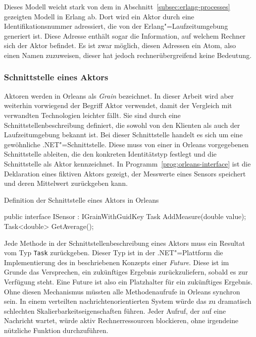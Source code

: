 Dieses Modell weicht stark von dem in Abschnitt~\ref{subsec:erlang-processes} gezeigten Modell in Erlang ab. Dort wird ein Aktor durch eine Identifikationsnummer adressiert, die von der Erlang"=Laufzeitumgebung generiert ist. Diese Adresse enthält sogar die Information, auf welchem Rechner sich der Aktor befindet. Es ist zwar möglich, diesen Adressen ein Atom, also einen Namen zuzuweisen, dieser hat jedoch rechnerübergreifend keine Bedeutung.

\subsubsection{Schnittstelle eines Aktors}

Aktoren werden in Orleans als \textit{Grain} bezeichnet. In dieser Arbeit wird aber weiterhin vorwiegend der Begriff Aktor verwendet, damit der Vergleich mit verwandten Technologien leichter fällt. Sie sind durch eine Schnittstellenbeschreibung definiert, die sowohl von den Klienten als auch der Laufzeitumgebung bekannt ist. Bei dieser Schnittstelle handelt es sich um eine gewöhnliche .NET"=Schnittstelle. Diese muss von einer in Orleans vorgegebenen Schnittstelle ableiten, die den konkreten Identitätstyp festlegt und die Schnittstelle als Aktor kennzeichnet. In Programm~\ref{prog:orleans-interface} ist die Deklaration eines fiktiven Aktors gezeigt, der Messwerte eines Sensors speichert und deren Mittelwert zurückgeben kann.

\begin{program}[!hbt]
\caption{Definition der Schnittstelle eines Aktors in Orleans}
\label{prog:orleans-interface}
\begin{CsCode}
public interface ISensor : IGrainWithGuidKey {
	Task AddMeasure(double value);
	Task<double> GetAverage();
}
\end{CsCode}
\end{program}

Jede Methode in der Schnittstellenbeschreibung eines Aktors muss ein Resultat vom Typ \lstinline{Task} zurückgeben. Dieser Typ ist in der .NET"=Plattform die Implementierung des in \cite{Baker:1977:IGC:800228.806932} beschriebenen Konzepts einer \textit{Future}. Diese ist im Grunde das Versprechen, ein zukünftiges Ergebnis zurückzuliefern, sobald es zur Verfügung steht. Eine Future ist also ein Platzhalter für ein zukünftiges Ergebnis. Ohne diesen Mechanismus müssten alle Methodenaufrufe in Orleans synchron sein. In einem verteilten nachrichtenorientierten System würde das zu dramatisch schlechten Skalierbarkeitseigenschaften führen. Jeder Aufruf, der auf eine Nachricht wartet, würde aktiv Rechnerressourcen blockieren, ohne irgendeine nützliche Funktion durchzuführen.

